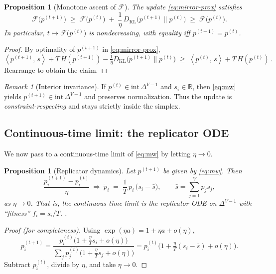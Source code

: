 \documentclass[11pt,reqno]{article}
\numberwithin{equation}{section}
\theoremstyle{plain}
\newtheorem{proposition}[theorem]{Proposition}
\theoremstyle{definition}
\theoremstyle{remark}
\newtheorem{remark}[theorem]{Remark}
\DeclareMathOperator{\KL}{KL}
\newcommand{\R}{\mathbb{R}}
\newcommand{\1}{\mathbbm{1}}
\newcommand{\ip}[2]{\left\langle #1,\, #2 \right\rangle}
\newcommand{\Hent}{H}
\newcommand{\simplex}{\Delta^{V-1}}
\newcommand{\avgscore}{\bar{s}}
\begin{document}
\begin{proposition}[Monotone ascent of $\mathcal{F}$]\label{prop:ascent}
The update \eqref{eq:mirror-prox} satisfies
\[
\mathcal{F}\!\big(p^{(t+1)}\big) \;\ge\; \mathcal{F}\!\big(p^{(t)}\big)\;+\;\frac{1}{\eta}\,D_{\KL}\!\big(p^{(t+1)}\|p^{(t)}\big)\;\ge\;\mathcal{F}\!\big(p^{(t)}\big).
\]
In particular, $t\mapsto \mathcal{F}\!\big(p^{(t)}\big)$ is nondecreasing, with equality iff $p^{(t+1)}=p^{(t)}$.
\end{proposition}

\begin{proof}
By optimality of $p^{(t+1)}$ in \eqref{eq:mirror-prox},
\[
\ip{p^{(t+1)}}{s} + T\,\Hent(p^{(t+1)}) - \tfrac{1}{\eta}D_{\KL}\!\big(p^{(t+1)}\|p^{(t)}\big)
\;\ge\; \ip{p^{(t)}}{s} + T\,\Hent(p^{(t)})\,.
\]
Rearrange to obtain the claim.
\end{proof}

\begin{remark}[Interior invariance]
If $p^{(t)}\in\mathrm{int}\,\simplex$ and $s_i\in\R$, then \eqref{eq:mw} yields $p^{(t+1)}\in\mathrm{int}\,\simplex$ and preserves normalization. Thus the update is \emph{constraint-respecting} and stays strictly inside the simplex.
\end{remark}

\subsection{Continuous-time limit: the replicator ODE}
We now pass to a continuous-time limit of \eqref{eq:mw} by letting $\eta\to 0$.

\begin{proposition}[Replicator dynamics]\label{prop:replicator}
Let $p^{(t+1)}$ be given by \eqref{eq:mw}. Then
\[
\frac{p^{(t+1)}_i - p^{(t)}_i}{\eta}\ \Longrightarrow\ \dot p_i \;=\; \frac{1}{T}\,p_i\,\big(s_i-\avgscore\big),\qquad
\avgscore=\sum_{j=1}^V p_j s_j,
\]
as $\eta\to 0$. That is, the continuous-time limit is the replicator ODE on $\simplex$ with ``fitness'' $f_i=s_i/T$. \citep[See, e.g.,][]{hofbauer1998evolutionary,shahshahani1979nouvelle,sandholm2010population}.
\end{proposition}

\begin{proof}[Proof (for completeness)]
Using $\exp(\eta a)=1+\eta a+o(\eta)$,
\[
p^{(t+1)}_i=\frac{p^{(t)}_i\big(1+\tfrac{\eta}{T}s_i+o(\eta)\big)}{\sum_j p^{(t)}_j\big(1+\tfrac{\eta}{T}s_j+o(\eta)\big)}
= p^{(t)}_i\Big(1+\tfrac{\eta}{T}(s_i-\avgscore)+o(\eta)\Big).
\]
Subtract $p^{(t)}_i$, divide by $\eta$, and take $\eta\to 0$.
\end{proof}
\end{document}
